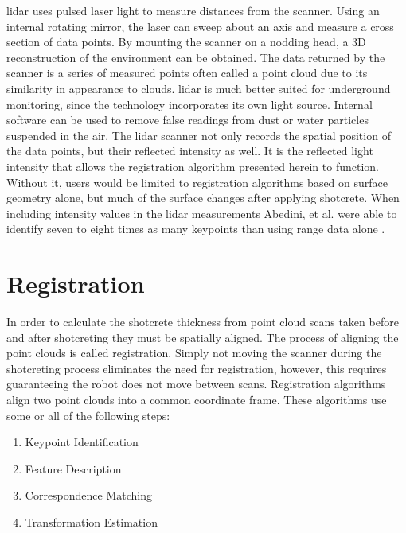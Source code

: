 \acrshort{lidar} uses pulsed laser light to measure distances from the scanner. Using an internal rotating mirror, the laser can sweep about an axis and measure a cross section of data points. By mounting the scanner on a nodding head, a 3D reconstruction of the environment can be obtained. The data returned by the scanner is a series of measured points often called a point cloud due to its similarity in appearance to clouds. \acrshort{lidar} is much better suited for underground monitoring, since the technology incorporates its own light source. Internal software can be used to remove false readings from dust or water particles suspended in the air. The \acrshort{lidar} scanner not only records the spatial position of the data points, but their reflected intensity as well. It is the reflected light intensity that allows the registration algorithm presented herein to function. Without it, users would be limited to registration algorithms based on surface geometry alone, but much of the surface changes after applying shotcrete. When including intensity values in the \acrshort{lidar} measurements Abedini, et al. were able to identify seven to eight times as many keypoints than using range data alone \cite{reg1}.\\

\section{Registration}

In order to calculate the shotcrete thickness from point cloud scans taken before and after shotcreting they must be spatially aligned. The process of aligning the point clouds is called registration. Simply not moving the scanner during the shotcreting process eliminates the need for registration, however, this requires guaranteeing the robot does not move between scans. Registration algorithms align two point clouds into a common coordinate frame. These algorithms use some or all of the following steps: 

\begin{enumerate}
    \item Keypoint Identification
    \item Feature Description
    \item Correspondence Matching
    \item Transformation Estimation
\end{enumerate}

